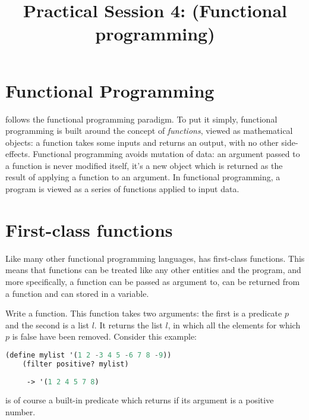 \documentclass{../../../tp}
\title{Practical Session 4: \scheme (Functional programming)}
\author{}
\begin{document}
	
	\maketitle



\section{Functional Programming}

\scheme follows the functional programming paradigm. To put it simply, functional programming is built around the concept of \emph{functions}, viewed as mathematical objects: a function takes some inputs and returns an output, with no other side-effects. Functional programming avoids mutation of data: an argument passed to a function is never modified itself, it's a new object which is returned as the result of applying a function to an argument. In functional programming, a program is viewed as a series of functions applied to input data.

\section{First-class functions}

Like many other functional programming languages, \scheme has first-class functions. This means that functions can be treated like any other entities and the program, and more specifically, a function can be passed as argument to, can be returned from a function and can stored in a variable.

\begin{instruction}
	Write a  function. This function takes two arguments: the first is a predicate $p$ and the second is a list $l$. It returns the list $l$, in which all the elements for which $p$ is false have been removed. Consider this example:

\begin{lstlisting}[language=lisp]
	(define mylist '(1 2 -3 4 5 -6 7 8 -9))
	(filter positive? mylist)
	 
	 -> '(1 2 4 5 7 8)
\end{lstlisting}

 is of course a built-in \scheme predicate which returns  if its argument is a positive number. 
\end{instruction}
\end{document}
